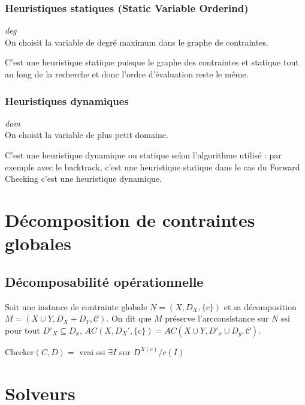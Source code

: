 \documentclass[a4paper,11pt]{thesis}
\begin{document}
\subsubsection{Heuristiques statiques (Static Variable Orderind)}

\begin{df}
    \emph{deg} \\
    On choisit la variable de degré maximum dans le graphe de contraintes.
\end{df}

C'est une heuristique statique puisque le graphe des contraintes et statique tout au long de la
recherche et donc l'ordre d'évaluation reste le même.

\subsubsection{Heuristiques dynamiques}

\begin{df}
    \emph{dom}\\
    On choisit la variable de plus petit domaine.
\end{df}

C'est une heuristique dynamique ou statique selon l'algorithme utilisé : par exemple avec le
backtrack, c'est une heuristique statique dans le cas du Forward Checking c'est une heuristique
dynamique.

\section{Décomposition de contraintes globales}

\subsection{Décomposabilité opérationnelle}

\begin{df}
    Soit une instance de contrainte globale $N = (X, D_X, \{c\})$ et sa décomposition $M = (X \cup Y, D_X +
    D_Y, \mathcal{C})$. On dit que $M$ préserve l'arcconsistance sur $N$ ssi pour tout $D'_X
    \subseteq D_x$, $AC(X, D_X', \{c\}) = AC(X \cup Y, D'_x \cup D_y, \mathcal{C})$.
\end{df}

\begin{df}
    Checker$(C, D) =$ vrai ssi $\exists I$ sur $D^{X(c)} / c(I)$
\end{df}

\section{Solveurs}
\end{document}
